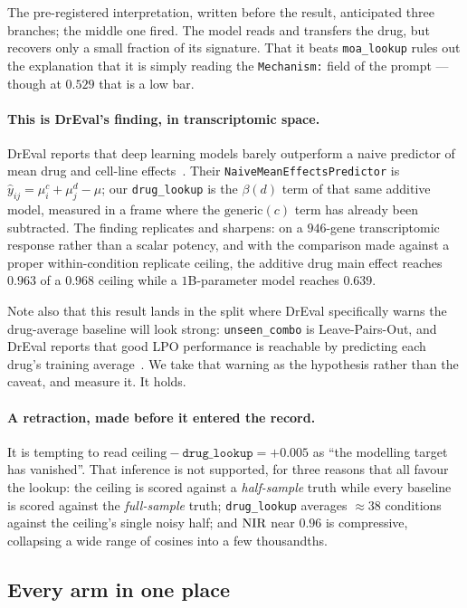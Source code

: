 The pre-registered interpretation, written before the result, anticipated three branches; the middle
one fired. The model reads and transfers the drug, but recovers only a small fraction of its
signature. That it beats \texttt{moa\_lookup} rules out the explanation that it is simply reading the
\texttt{Mechanism:} field of the prompt --- though at $0.529$ that is a low bar.

\paragraph{This is DrEval's finding, in transcriptomic space.} DrEval reports that deep learning
models barely outperform a naive predictor of mean drug and cell-line
effects~\cite{dreval}. Their \texttt{NaiveMeanEffectsPredictor} is
$\hat{y}_{ij} = \mu^c_i + \mu^d_j - \mu$; our \texttt{drug\_lookup} is the $\beta(d)$ term of that
same additive model, measured in a frame where the $\textrm{generic}(c)$ term has already been
subtracted. The finding replicates and sharpens: on a $946$-gene transcriptomic response rather than
a scalar potency, and with the comparison made against a proper within-condition replicate ceiling,
the additive drug main effect reaches $0.963$ of a $0.968$ ceiling while a $1$B-parameter model
reaches $0.639$.

Note also that this result lands in the split where DrEval specifically warns the drug-average
baseline will look strong: \texttt{unseen\_combo} is Leave-Pairs-Out, and DrEval reports
that good LPO performance is reachable by predicting each drug's training average~\cite{partin}.
We take that warning as the hypothesis rather than the caveat, and measure it. It holds.

\paragraph{A retraction, made before it entered the record.} It is tempting to read
$\textrm{ceiling} - \texttt{drug\_lookup} = +0.005$ as ``the modelling target has vanished''. That
inference is not supported, for three reasons that all favour the lookup: the ceiling is scored
against a \emph{half-sample} truth while every baseline is scored against the \emph{full-sample}
truth; \texttt{drug\_lookup} averages $\approx38$ conditions against the ceiling's single noisy half;
and $\textrm{NIR}$ near $0.96$ is compressive, collapsing a wide range of cosines into a few thousandths.

\subsection{Every arm in one place}
\label{sec:res-summary}

